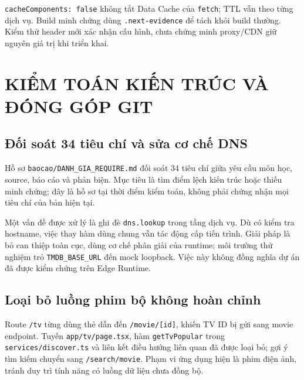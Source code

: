 \documentclass[12pt,a4paper]{extarticle}
\begin{document}
\texttt{cacheComponents: false} không tắt Data Cache của \texttt{fetch}; TTL vẫn theo từng dịch vụ. Build minh chứng dùng \texttt{.next-evidence} để tách khỏi build thường. Kiểm thử header mới xác nhận cấu hình, chưa chứng minh proxy/CDN giữ nguyên giá trị khi triển khai.

\clearpage
\section{KIỂM TOÁN KIẾN TRÚC VÀ ĐÓNG GÓP GIT}
\subsection{Đối soát 34 tiêu chí và sửa cơ chế DNS}
Hồ sơ \nolinkurl{baocao/DANH_GIA_REQUIRE.md} đối soát 34 tiêu chí giữa yêu cầu môn học, source, báo cáo và phản biện. Mục tiêu là tìm điểm lệch kiến trúc hoặc thiếu minh chứng; đây là hồ sơ tại thời điểm kiểm toán, không phải chứng nhận mọi tiêu chí của bản hiện tại.

Một vấn đề được xử lý là ghi đè \texttt{dns.lookup} trong tầng dịch vụ. Dù có kiểm tra hostname, việc thay hàm dùng chung vẫn tác động cấp tiến trình. Giải pháp là bỏ can thiệp toàn cục, dùng cơ chế phân giải của runtime; môi trường thử nghiệm trỏ \nolinkurl{TMDB_BASE_URL} đến mock loopback. Việc này không đồng nghĩa dự án đã được kiểm chứng trên Edge Runtime.

\subsection{Loại bỏ luồng phim bộ không hoàn chỉnh}
Route \texttt{/tv} từng dùng thẻ dẫn đến \texttt{/movie/[id]}, khiến TV ID bị gửi sang movie endpoint. Tuyến \nolinkurl{app/tv/page.tsx}, hàm \texttt{getTvPopular} trong \nolinkurl{services/discover.ts} và liên kết điều hướng liên quan đã được loại bỏ; gợi ý tìm kiếm chuyển sang \texttt{/search/movie}. Phạm vi ứng dụng hiện là phim điện ảnh, tránh duy trì tính năng có luồng dữ liệu chưa đồng bộ.
\end{document}
